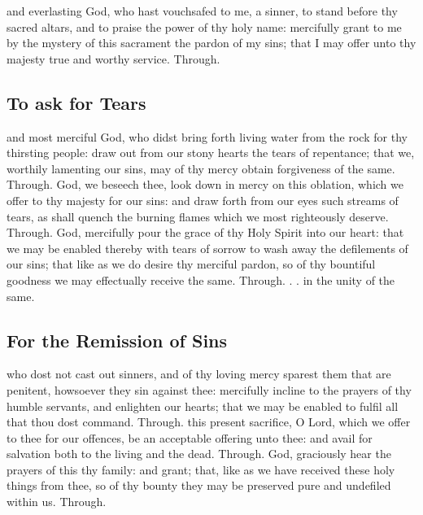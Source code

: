 \begin{multicols}{2}
\postcommunion
{} and everlasting God, who hast vouchsafed to me, a sinner, to stand before thy sacred altars, and to praise the power of thy holy name: mercifully grant to me by the mystery of this sacrament the pardon of my sins; that I may offer unto thy majesty true and worthy service. Through.


   \newcolumn


\subsection{To ask for Tears}
\collect
{} and most merciful God, who didst bring forth living water from the rock for thy thirsting people: draw out from our stony hearts the tears of repentance; that we, worthily lamenting our sins, may of thy mercy obtain forgiveness of the same. Through.
\secret
{} God, we beseech thee, look down in mercy on this oblation, which we offer to thy majesty for our sins: and draw forth from our eyes such streams of tears, as shall quench the burning flames which we most righteously deserve. Through.
\postcommunion
{} God, mercifully pour the grace of thy Holy Spirit into our heart: that we may be enabled thereby with tears of sorrow to wash away the defilements of our sins; that like as we do desire thy merciful pardon, so of thy bountiful goodness we may effectually receive the same. Through. . . in the unity of the same.

   \newcolumn

\subsection{For the Remission of Sins}
\collect
{} who dost not cast out sinners, and of thy loving mercy sparest them that are penitent, howsoever they sin against thee: mercifully incline to the prayers of thy humble servants, and enlighten our hearts; that we may be enabled to fulfil all that thou dost command. Through.
\secret
{} this present sacrifice, O Lord, which we offer to thee for our offences, be an acceptable offering unto thee: and avail for salvation both to the living and the dead. Through.
\postcommunion
{} God, graciously hear the prayers of this thy family: and grant; that, like as we have received these holy things from thee, so of thy bounty they may be preserved pure and undefiled within us. Through.


\end{multicols}
